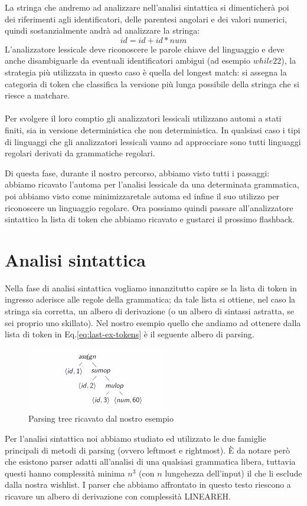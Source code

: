 \documentclass[class=book, crop=false, oneside, 12pt]{standalone}
\begin{document}
La stringa che andremo ad analizzare nell'analisi sintattica si dimenticherà poi dei riferimenti agli identificatori, delle parentesi angolari e dei valori numerici, quindi sostanzialmente andrà ad analizzare la stringa:
\begin{equation}
    id = id + id * num
\end{equation}
L'analizzatore lessicale deve riconoscere le parole chiave del linguaggio e deve anche disambiguarle da eventuali identificatori ambigui (ad esempio \(while22\)), la strategia più utilizzata in questo caso è quella del longest match: si assegna la categoria di token che classifica la versione più lunga possibile della stringa che si riesce a matchare.
\\\\
Per svolgere il loro comptio gli analizzatori lessicali utilizzano automi a stati finiti, sia in versione deterministica che non deterministica.
In qualsiasi caso i tipi di linguaggi che gli analizzatori lessicali vanno ad approcciare sono tutti linguaggi regolari derivati da grammatiche regolari.

Di questa fase, durante il nostro percorso, abbiamo visto tutti i passaggi: abbiamo ricavato l'automa per l'analisi lessicale da una determinata grammatica, poi abbiamo visto come minimizzaretale automa ed infine il suo utilizzo per riconoscere un linguaggio regolare.
Ora possiamo quindi passare all'analizzatore sintattico la lista di token che abbiamo ricavato e gustarci il prossimo flashback. 

\section{Analisi sintattica}
Nella fase di analisi sintattica vogliamo innanzitutto capire se la lista di token in ingresso aderisce alle regole della grammatica; da tale lista si ottiene, nel caso la stringa sia corretta, un albero di derivazione (o un albero di sintassi astratta, se sei proprio uno skillato).
Nel nostro esempio quello che andiamo ad ottenere dalla lista di token in Eq.\ref{eq:last-ex-tokens} è il seguente albero di parsing.
\begin{figure}[H]
    \centering
    \includegraphics[width=.4\textwidth]{final-example-parsing-tree.png}
    \caption{Parsing tree ricavato dal nostro esempio}
    \label{fig:last-ex-parse-tree}
\end{figure}
Per l'analisi sintattica noi abbiamo studiato ed utilizzato le due famiglie principali di metodi di parsing (ovvero leftmost e rightmost). 
È da notare però che esistono parser adatti all'analisi di una qualsiasi grammatica libera, tuttavia questi hanno complessità minima \(n^3\) (con \(n\) lungehezza dell'input) il che li esclude dalla nostra wishlist.
I parser che abbiamo affrontato in questo testo riescono a ricavare un albero di derivazione con complessità LINEAREH.
\end{document}
